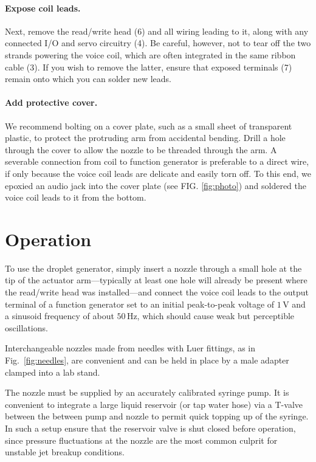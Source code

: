\documentclass[11.5pt,oneside]{book}
\newcommand*{\figref}[1]{Fig.~\ref{#1}}
\begin{document}
\paragraph{Expose coil leads.} Next, remove the read/write head (6) and all
wiring leading to it, along with any connected I/O and servo circuitry (4). Be
careful, however, not to tear off the two strands powering the voice coil, which
are often integrated in the same ribbon cable (3). If you wish to remove the
latter, ensure that exposed terminals (7) remain onto which you can solder new leads.

\paragraph{Add protective cover.} We recommend bolting on a cover plate, such
as a small sheet of transparent plastic, to protect the protruding arm from
accidental bending. Drill a hole through the cover to allow the nozzle to be
threaded through the arm. A severable
connection from coil to function generator is preferable to a direct wire, if
only because the voice coil leads are delicate and easily torn off. To this end, we epoxied
an audio jack into the cover plate (see FIG. \ref{fig:photo}) and soldered the voice coil leads to it from the
bottom.

\section{Operation}
To use the droplet generator, simply insert a nozzle through a small hole at the
tip of the actuator arm---typically at least one hole will already be present
where the read/write head was installed---and connect the voice coil leads to the output terminal of a function
generator set to an initial peak-to-peak voltage of $1\,$V and a sinusoid frequency of
about $50\,$Hz, which should cause weak but perceptible oscillations.

Interchangeable nozzles made from needles with Luer fittings, as in \figref{fig:needles}, are
convenient and can be held in place by a male adapter clamped into a lab stand.

The nozzle must be supplied by an accurately calibrated syringe pump. It is
convenient to integrate a large liquid reservoir (or tap water hose) via a
T-valve between the between pump and nozzle to permit quick topping up of the
syringe. In such a setup ensure that the reservoir valve is shut closed before operation,
since pressure fluctuations at the nozzle are the most common culprit for
unstable jet breakup conditions.
\end{document}
